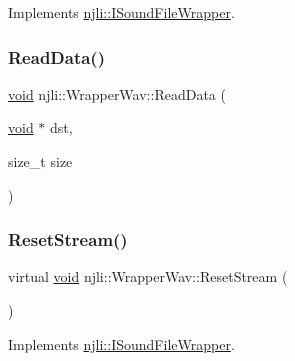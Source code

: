 Implements \mbox{\hyperlink{classnjli_1_1_i_sound_file_wrapper_a2c4dc8cc613f8f545b0e1ead86ee7e4d}{njli\+::\+I\+Sound\+File\+Wrapper}}.

\mbox{\label{classnjli_1_1_wrapper_wav_a8e5df03af7dc8f841c9e316caa00a13d}} 
\subsubsection{\texorpdfstring{Read\+Data()}{ReadData()}}
{\footnotesize\ttfamily \mbox{\hyperlink{_thread_8h_af1e856da2e658414cb2456cb6f7ebc66}{void}} njli\+::\+Wrapper\+Wav\+::\+Read\+Data (\begin{DoxyParamCaption}\item[{\mbox{\hyperlink{_thread_8h_af1e856da2e658414cb2456cb6f7ebc66}{void}} $\ast$}]{dst,  }\item[{size\+\_\+t}]{size }\end{DoxyParamCaption})\hspace{0.3cm}{\ttfamily [private]}}

\mbox{\label{classnjli_1_1_wrapper_wav_ab24f4e589680e0abe321e105f01468bf}} 
\subsubsection{\texorpdfstring{Reset\+Stream()}{ResetStream()}}
{\footnotesize\ttfamily virtual \mbox{\hyperlink{_thread_8h_af1e856da2e658414cb2456cb6f7ebc66}{void}} njli\+::\+Wrapper\+Wav\+::\+Reset\+Stream (\begin{DoxyParamCaption}{ }\end{DoxyParamCaption})\hspace{0.3cm}{\ttfamily [virtual]}}



Implements \mbox{\hyperlink{classnjli_1_1_i_sound_file_wrapper_ab302d724c78a9a55f6dcb288d31e6854}{njli\+::\+I\+Sound\+File\+Wrapper}}.

\mbox{\label{classnjli_1_1_wrapper_wav_aa75e013ec22ca84b54ee33428dcd3d09}} 

